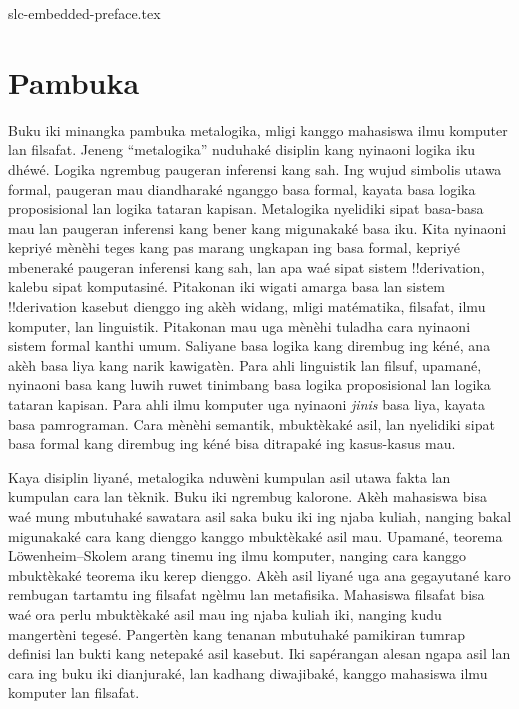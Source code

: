 \begin{filecontents*}[overwrite]{slc-embedded-preface.tex}
\chapter{Pambuka}

Buku iki minangka pambuka metalogika, mligi kanggo mahasiswa ilmu komputer
lan filsafat. Jeneng “metalogika” nuduhaké disiplin kang nyinaoni logika
iku dhéwé. Logika ngrembug paugeran inferensi kang sah. Ing wujud simbolis
utawa formal, paugeran mau diandharaké nganggo basa formal, kayata basa
logika proposisional lan logika tataran kapisan. Metalogika nyelidiki sipat
basa-basa mau lan paugeran inferensi kang bener kang migunakaké basa iku.
Kita nyinaoni kepriyé mènèhi teges kang pas marang ungkapan ing basa formal,
kepriyé mbeneraké paugeran inferensi kang sah, lan apa waé sipat sistem
!!{derivation}, kalebu sipat komputasiné. Pitakonan iki wigati amarga basa
lan sistem !!{derivation} kasebut dienggo ing akèh widang, mligi matématika,
filsafat, ilmu komputer, lan linguistik. Pitakonan mau uga mènèhi tuladha
cara nyinaoni sistem formal kanthi umum. Saliyane basa logika kang
dirembug ing kéné, ana akèh basa liya kang narik kawigatèn. Para ahli
linguistik lan filsuf, upamané, nyinaoni basa kang luwih ruwet tinimbang
basa logika proposisional lan logika tataran kapisan. Para ahli ilmu
komputer uga nyinaoni \emph{jinis} basa liya, kayata basa pamrograman.
Cara mènèhi semantik, mbuktèkaké asil, lan nyelidiki sipat basa formal kang
dirembug ing kéné bisa ditrapaké ing kasus-kasus mau.

Kaya disiplin liyané, metalogika nduwèni kumpulan asil utawa fakta lan
kumpulan cara lan tèknik. Buku iki ngrembug kalorone. Akèh mahasiswa
bisa waé mung mbutuhaké sawatara asil saka buku iki ing njaba kuliah,
nanging bakal migunakaké cara kang dienggo kanggo mbuktèkaké asil mau.
Upamané, teorema L\"owenheim--Skolem arang tinemu ing ilmu komputer,
nanging cara kanggo mbuktèkaké teorema iku kerep dienggo. Akèh asil
liyané uga ana gegayutané karo rembugan tartamtu ing filsafat ngèlmu
lan metafisika. Mahasiswa filsafat bisa waé ora perlu mbuktèkaké asil
mau ing njaba kuliah iki, nanging kudu mangertèni tegesé. Pangertèn
kang tenanan mbutuhaké pamikiran tumrap definisi lan bukti kang
netepaké asil kasebut. Iki sapérangan alesan ngapa asil lan cara ing
buku iki dianjuraké, lan kadhang diwajibaké, kanggo mahasiswa ilmu
komputer lan filsafat.


\end{filecontents*}
